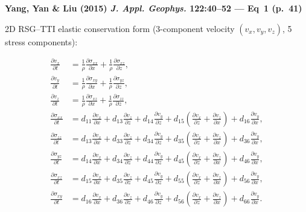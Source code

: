 \noindent\textbf{Yang, Yan \& Liu (2015) \emph{J. Appl. Geophys.} 122:40--52 — Eq~1 (p.~41)}

\smallskip

\noindent 2D RSG--TTI elastic conservation form (3-component velocity $(v_x, v_y, v_z)$, 5 stress components):

\smallskip

\begin{align}
\frac{\partial v_x}{\partial t} &= \frac{1}{\rho}\frac{\partial \sigma_{xx}}{\partial x}
                                 + \frac{1}{\rho}\frac{\partial \sigma_{xz}}{\partial z},
\tag{1a}\\[3pt]
\frac{\partial v_y}{\partial t} &= \frac{1}{\rho}\frac{\partial \sigma_{xy}}{\partial x}
                                 + \frac{1}{\rho}\frac{\partial \sigma_{yz}}{\partial z},
\tag{1b}\\[3pt]
\frac{\partial v_z}{\partial t} &= \frac{1}{\rho}\frac{\partial \sigma_{xz}}{\partial x}
                                 + \frac{1}{\rho}\frac{\partial \sigma_{zz}}{\partial z},
\tag{1c}\\[3pt]
\frac{\partial \sigma_{xx}}{\partial t}
   &= d_{11}\frac{\partial v_x}{\partial x}
     + d_{13}\frac{\partial v_z}{\partial z}
     + d_{14}\frac{\partial v_y}{\partial z}
     + d_{15}\!\left(\frac{\partial v_x}{\partial z}
                     + \frac{\partial v_z}{\partial x}\right)
     + d_{16}\frac{\partial v_y}{\partial x},
\tag{1d}\\[3pt]
\frac{\partial \sigma_{zz}}{\partial t}
   &= d_{13}\frac{\partial v_x}{\partial x}
     + d_{33}\frac{\partial v_z}{\partial z}
     + d_{34}\frac{\partial v_y}{\partial z}
     + d_{35}\!\left(\frac{\partial v_x}{\partial z}
                     + \frac{\partial v_z}{\partial x}\right)
     + d_{36}\frac{\partial v_y}{\partial x},
\tag{1e}\\[3pt]
\frac{\partial \sigma_{yz}}{\partial t}
   &= d_{14}\frac{\partial v_x}{\partial x}
     + d_{34}\frac{\partial v_z}{\partial z}
     + d_{44}\frac{\partial v_y}{\partial z}
     + d_{45}\!\left(\frac{\partial v_x}{\partial z}
                     + \frac{\partial v_z}{\partial x}\right)
     + d_{46}\frac{\partial v_y}{\partial x},
\tag{1f}\\[3pt]
\frac{\partial \sigma_{xz}}{\partial t}
   &= d_{15}\frac{\partial v_x}{\partial x}
     + d_{35}\frac{\partial v_z}{\partial z}
     + d_{45}\frac{\partial v_y}{\partial z}
     + d_{55}\!\left(\frac{\partial v_x}{\partial z}
                     + \frac{\partial v_z}{\partial x}\right)
     + d_{56}\frac{\partial v_y}{\partial x},
\tag{1g}\\[3pt]
\frac{\partial \sigma_{xy}}{\partial t}
   &= d_{16}\frac{\partial v_x}{\partial x}
     + d_{36}\frac{\partial v_z}{\partial z}
     + d_{46}\frac{\partial v_y}{\partial z}
     + d_{56}\!\left(\frac{\partial v_x}{\partial z}
                     + \frac{\partial v_z}{\partial x}\right)
     + d_{66}\frac{\partial v_y}{\partial x}.
\tag{1h}
\end{align}

